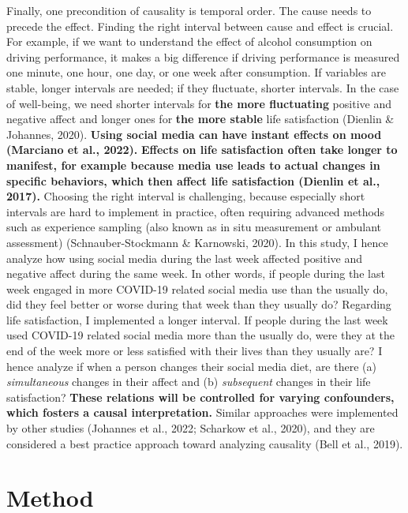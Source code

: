 \documentclass[
  man,mask]{apa7}
\begin{document}
Finally, one precondition of causality is temporal order.
The cause needs to precede the effect.
Finding the right interval between cause and effect is crucial.
For example, if we want to understand the effect of alcohol consumption on driving performance, it makes a big difference if driving performance is measured one minute, one hour, one day, or one week after consumption.
If variables are stable, longer intervals are needed; if they fluctuate, shorter intervals.
In the case of well-being, we need shorter intervals for \textbf{the more fluctuating} positive and negative affect and longer ones for \textbf{the more stable} life satisfaction (Dienlin \& Johannes, 2020).
\textbf{Using social media can have instant effects on mood (Marciano et al., 2022).}
\textbf{Effects on life satisfaction often take longer to manifest, for example because media use leads to actual changes in specific behaviors, which then affect life satisfaction (Dienlin et al., 2017).}
Choosing the right interval is challenging, because especially short intervals are hard to implement in practice, often requiring advanced methods such as experience sampling (also known as in situ measurement or ambulant assessment) (Schnauber-Stockmann \& Karnowski, 2020).
In this study, I hence analyze how using social media during the last week affected positive and negative affect during the same week.
In other words, if people during the last week engaged in more COVID-19 related social media use than the usually do, did they feel better or worse during that week than they usually do?
Regarding life satisfaction, I implemented a longer interval.
If people during the last week used COVID-19 related social media more than the usually do, were they at the end of the week more or less satisfied with their lives than they usually are?
I hence analyze if when a person changes their social media diet, are there (a) \emph{simultaneous} changes in their affect and (b) \emph{subsequent} changes in their life satisfaction?
\textbf{These relations will be controlled for varying confounders, which fosters a causal interpretation.}
Similar approaches were implemented by other studies (Johannes et al., 2022; Scharkow et al., 2020), and they are considered a best practice approach toward analyzing causality (Bell et al., 2019).

\hypertarget{method}{%
\section{Method}\label{method}}
\end{document}
